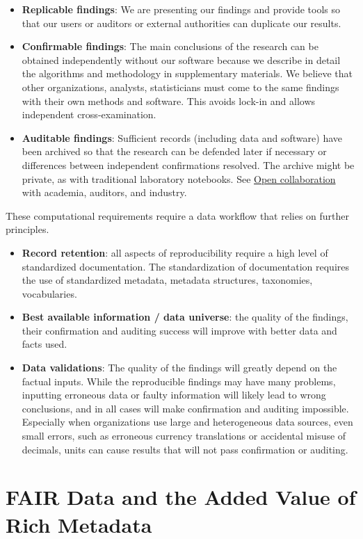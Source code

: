 \documentclass[
  a4paper,
  openany, a4paper, oneside]{book}
\begin{document}
\begin{itemize}
\item
  \textbf{Replicable findings}: We are presenting our findings and provide tools so that our users or auditors or external authorities can duplicate our results.
\item
  \textbf{Confirmable findings}: The main conclusions of the research can be obtained independently without our software because we describe in detail the algorithms and methodology in supplementary materials. We believe that other organizations, analysts, statisticians must come to the same findings with their own methods and software. This avoids lock-in and allows independent cross-examination.
\item
  \textbf{Auditable findings}: Sufficient records (including data and software) have been archived so that the research can be defended later if necessary or differences between independent confirmations resolved. The archive might be private, as with traditional laboratory notebooks. See \protect\hyperlink{opencollaboration}{Open collaboration} with academia, auditors, and industry.
\end{itemize}

These computational requirements require a data workflow that relies on further principles.

\begin{itemize}
\item
  \textbf{Record retention}: all aspects of reproducibility require a high level of standardized documentation. The standardization of documentation requires the use of standardized metadata, metadata structures, taxonomies, vocabularies.
\item
  \textbf{Best available information / data universe}: the quality of the findings, their confirmation and auditing success will improve with better data and facts used.
\item
  \textbf{Data validations}: The quality of the findings will greatly depend on the factual inputs. While the reproducible findings may have many problems, inputting erroneous data or faulty information will likely lead to wrong conclusions, and in all cases will make confirmation and auditing impossible. Especially when organizations use large and heterogeneous data sources, even small errors, such as erroneous currency translations or accidental misuse of decimals, units can cause results that will not pass confirmation or auditing.
\end{itemize}

\hypertarget{FAIR-data}{%
\chapter{FAIR Data and the Added Value of Rich Metadata}\label{FAIR-data}}
\end{document}
